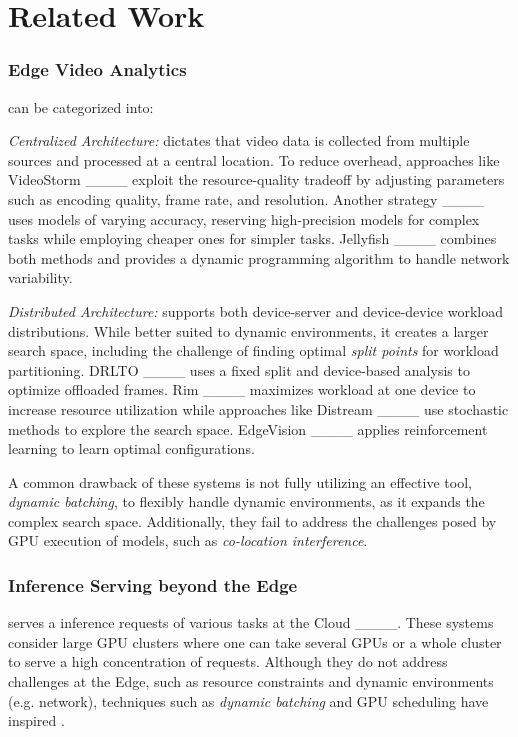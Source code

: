 \section{Related Work}
\label{sec:related-work}

\subsubsection{\textbf{Edge Video Analytics}} can be categorized into:
\hfill

\textit{Centralized Architecture: } dictates that video data is collected from multiple sources and processed at a central location.
To reduce overhead, approaches like VideoStorm ____ exploit the resource-quality tradeoff by adjusting parameters such as encoding quality, frame rate, and resolution.
Another strategy ____ uses models of varying accuracy, reserving high-precision models for complex tasks while employing cheaper ones for simpler tasks.
Jellyfish ____ combines both methods and provides a dynamic programming algorithm to handle network variability.

\textit{Distributed Architecture: } supports both device-server and device-device workload distributions.
While better suited to dynamic environments, it creates a larger search space, including the challenge of finding optimal \textit{split points} for workload partitioning.
DRLTO ____ uses a fixed split and device-based analysis to optimize offloaded frames.
Rim ____ maximizes workload at one device to increase resource utilization while approaches like Distream ____ use stochastic methods to explore the search space.
EdgeVision ____ applies reinforcement learning to learn optimal configurations.

A common drawback of these systems is not fully utilizing an effective tool, \textit{dynamic batching}, to flexibly handle dynamic environments, as it expands the complex search space. Additionally, they fail to address the challenges posed by GPU execution of models, such as \textit{co-location interference}.

\subsubsection{\textbf{Inference Serving beyond the Edge}} serves a inference requests of various tasks at the Cloud ____.
These systems consider large GPU clusters where one can take several GPUs or a whole cluster to serve a high concentration of requests.
Although they do not address challenges at the Edge, such as resource constraints and dynamic environments (e.g. network), techniques such as \textit{dynamic batching} and GPU scheduling have inspired \systemname{}.



